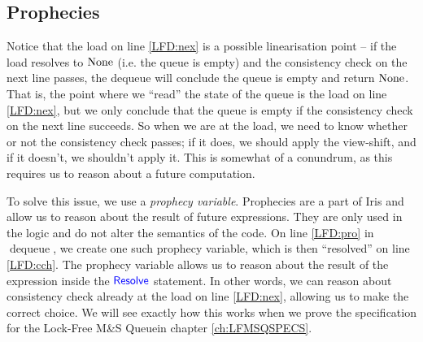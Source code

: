 \documentclass[a4paper, 10pt]{report}
\theoremstyle{definition}
\newcommand{\dequeue}{\operatorname{dequeue}}
\newcommand{\msq}{M\&S Queue}
\newcommand{\lfmsq}{Lock-Free \msq{}}
\begin{document}
\subsection{Prophecies}
Notice that the load on line \ref{LFD:nex} is a possible linearisation point -- if the load resolves to $\operatorname{None}$ (i.e. the queue is empty) and the consistency check on the next line passes, the dequeue will conclude the queue is empty and return $\operatorname{None}$. That is, the point where we ``read'' the state of the queue is the load on line \ref{LFD:nex}, but we only conclude that the queue is empty if the consistency check on the next line succeeds. So when we are at the load, we need to know whether or not the consistency check passes; if it does, we should apply the view-shift, and if it doesn't, we shouldn't apply it. This is somewhat of a conundrum, as this requires us to reason about a future computation.

To solve this issue, we use a \textit{prophecy variable}. Prophecies are a part of Iris and allow us to reason about the result of future expressions. They are only used in the logic and do not alter the semantics of the code. On line \ref{LFD:pro} in $\dequeue$, we create one such prophecy variable, which is then ``resolved'' on line \ref{LFD:cch}. The prophecy variable allows us to reason about the result of the expression inside the $\textsf{\color{blue} Resolve}$ statement. In other words, we can reason about consistency check already at the load on line \ref{LFD:nex}, allowing us to make the correct choice. We will see exactly how this works when we prove the specification for the \lfmsq in chapter \ref{ch:LFMSQSPECS}.
\end{document}
